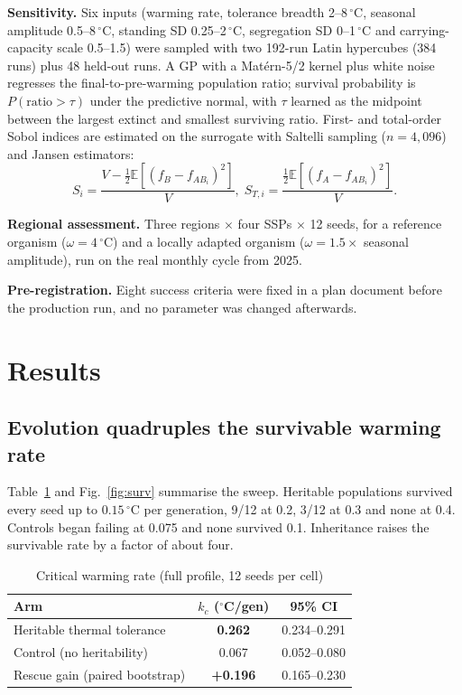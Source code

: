 \documentclass[conference]{IEEEtran}
\begin{document}
\textbf{Sensitivity.} Six inputs (warming rate, tolerance breadth 2--8\,$^{\circ}$C,
seasonal amplitude 0.5--8\,$^{\circ}$C, standing SD 0.25--2\,$^{\circ}$C,
segregation SD 0--1\,$^{\circ}$C and carrying-capacity scale 0.5--1.5) were
sampled with two 192-run Latin hypercubes (384 runs) plus 48 held-out runs. A GP
with a Mat\'ern-5/2 kernel plus white noise regresses the final-to-pre-warming
population ratio; survival probability is $P(\text{ratio}>\tau)$ under the
predictive normal, with $\tau$ learned as the midpoint between the largest extinct
and smallest surviving ratio. First- and total-order Sobol indices are estimated on
the surrogate with Saltelli sampling ($n=4{,}096$) and Jansen estimators:
\begin{equation}
S_i=\frac{V-\tfrac12\mathbb{E}[(f_B-f_{AB_i})^2]}{V},\;
S_{T,i}=\frac{\tfrac12\mathbb{E}[(f_A-f_{AB_i})^2]}{V}.
\end{equation}

\textbf{Regional assessment.} Three regions $\times$ four SSPs $\times$ 12 seeds,
for a reference organism ($\omega=4\,^{\circ}$C) and a locally adapted organism
($\omega=1.5\times$ seasonal amplitude), run on the real monthly cycle from 2025.

\textbf{Pre-registration.} Eight success criteria were fixed in a plan document
before the production run, and no parameter was changed afterwards.

\section{Results}
\label{sec:results}
\subsection{Evolution quadruples the survivable warming rate}
Table~\ref{tab:kc} and Fig.~\ref{fig:surv} summarise the sweep. Heritable
populations survived every seed up to $0.15\,^{\circ}$C per generation, 9/12 at
0.2, 3/12 at 0.3 and none at 0.4. Controls began failing at 0.075 and none survived
0.1. Inheritance raises the survivable rate by a factor of about four.

\begin{table}[t]
\caption{Critical warming rate (full profile, 12 seeds per cell)}
\label{tab:kc}
\centering
\begin{tabular}{lcc}
\toprule
Arm & $k_c$ ($^{\circ}$C/gen) & 95\% CI\\
\midrule
Heritable thermal tolerance & \textbf{0.262} & 0.234--0.291\\
Control (no heritability) & 0.067 & 0.052--0.080\\
Rescue gain (paired bootstrap) & \textbf{+0.196} & 0.165--0.230\\
\bottomrule
\end{tabular}
\end{table}
\end{document}
